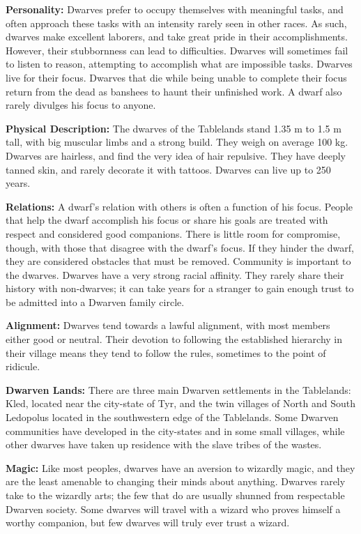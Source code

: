\textbf{Personality:} Dwarves prefer to occupy themselves with meaningful tasks, and often approach these tasks with an intensity rarely seen in other races. As such, dwarves make excellent laborers, and take great pride in their accomplishments. However, their stubbornness can lead to difficulties. Dwarves will sometimes fail to listen to reason, attempting to accomplish what are impossible tasks. Dwarves live for their focus. Dwarves that die while being unable to complete their focus return from the dead as banshees to haunt their unfinished work. A dwarf also rarely divulges his focus to anyone.

\textbf{Physical Description:} The dwarves of the Tablelands stand 1.35 m to 1.5 m tall, with big muscular limbs and a strong build. They weigh on average 100 kg. Dwarves are hairless, and find the very idea of hair repulsive. They have deeply tanned skin, and rarely decorate it with tattoos. Dwarves can live up to 250 years.

\textbf{Relations:} A dwarf's relation with others is often a function of his focus. People that help the dwarf accomplish his focus or share his goals are treated with respect and considered good companions. There is little room for compromise, though, with those that disagree with the dwarf's focus. If they hinder the dwarf, they are considered obstacles that must be removed. Community is important to the dwarves. Dwarves have a very strong racial affinity. They rarely share their history with non-dwarves; it can take years for a stranger to gain enough trust to be admitted into a Dwarven family circle.

\textbf{Alignment:} Dwarves tend towards a lawful alignment, with most members either good or neutral. Their devotion to following the established hierarchy in their village means they tend to follow the rules, sometimes to the point of ridicule.

\textbf{Dwarven Lands:} There are three main Dwarven settlements in the Tablelands: Kled, located near the city-state of Tyr, and the twin villages of North and South Ledopolus located in the southwestern edge of the Tablelands. Some Dwarven communities have developed in the city-states and in some small villages, while other dwarves have taken up residence with the slave tribes of the wastes.

\textbf{Magic:} Like most peoples, dwarves have an aversion to wizardly magic, and they are the least amenable to changing their minds about anything. Dwarves rarely take to the wizardly arts; the few that do are usually shunned from respectable Dwarven society. Some dwarves will travel with a wizard who proves himself a worthy companion, but few dwarves will truly ever trust a wizard.

